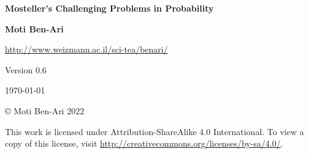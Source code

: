 

\thispagestyle{empty}

\begin{center}
\textbf{\LARGE Mosteller's Challenging Problems in Probability}

\bigskip
\bigskip
\bigskip

\textbf{\Large Moti Ben-Ari}

\bigskip

\url{http://www.weizmann.ac.il/sci-tea/benari/}

\bigskip
\bigskip
\bigskip

Version $0.6$

\bigskip

\today

\end{center}

\vfill

\begin{center}
\copyright{} Moti Ben-Ari $2022$
 \end{center}
 
\begin{small}
This work is licensed under Attribution-ShareAlike 4.0 International. To view a copy of this license, visit \url{http://creativecommons.org/licenses/by-sa/4.0/}.
\end{small}
\newpage

\tableofcontents

\newpage

